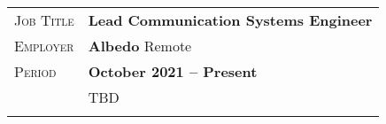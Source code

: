 \documentclass[a4paper, oneside, final]{scrartcl}
\newcommand{\gray}{\rowcolor[gray]{.90}} %
\begin{document}
\begin{center}
\begin{tabularx}{0.97\linewidth}{>{\raggedleft\scshape}p{2cm}X}
\gray Job Title & \textbf{Lead Communication Systems Engineer}\\
\gray Employer & \textbf{Albedo} \hfill Remote\\
\gray Period & \textbf{October 2021 -- Present}\\
&
\vspace{-0.15 cm}
TBD
\\
\\
\end{tabularx}


\end{center}
\end{document}
